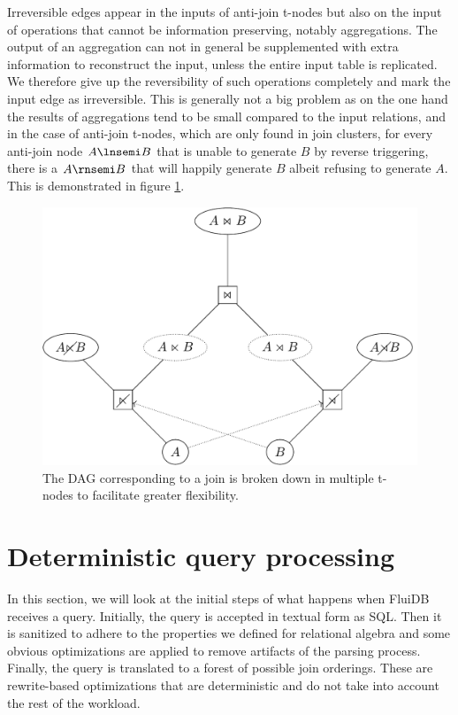 Irreversible edges appear in the inputs of anti-join t-nodes but also
on the input of operations that cannot be information preserving,
notably aggregations. The output of an aggregation can not in general
be supplemented with extra information to reconstruct the input,
unless the entire input table is replicated. We therefore give up the
reversibility of such operations completely and mark the input edge
as irreversible. This is generally not a big problem as on the one
hand the results of aggregations tend to be small compared to the
input relations, and in the case of anti-join t-nodes, which are only
found in join clusters, for every anti-join node \(A \lnsemi B\) that
is unable to generate \(B\) by reverse triggering, there is a \(A
\rnsemi B\) that will happily generate \(B\) albeit refusing to
generate \(A\). This is demonstrated in figure \ref{fig:joinnetdir}.

\begin{figure}[H]
  \centering
  \includegraphics[width=.9\linewidth]{./imgs/joinnetdir.pdf}
  \caption{\label{fig:joinnetdir}The DAG corresponding to a join is
    broken down in multiple t-nodes to facilitate greater
    flexibility.}
\end{figure}

\section{Deterministic query processing}
\label{sec:query_processing}

In this section, we will look at the initial steps of what happens when
FluiDB receives a query. Initially, the query is accepted in textual
form as SQL. Then it is sanitized to adhere to the properties we
defined for relational algebra and some obvious optimizations are
applied to remove artifacts of the parsing process. Finally, the query
is translated to a forest of possible join orderings. These are
rewrite-based optimizations that are deterministic and do not take
into account the rest of the workload.

